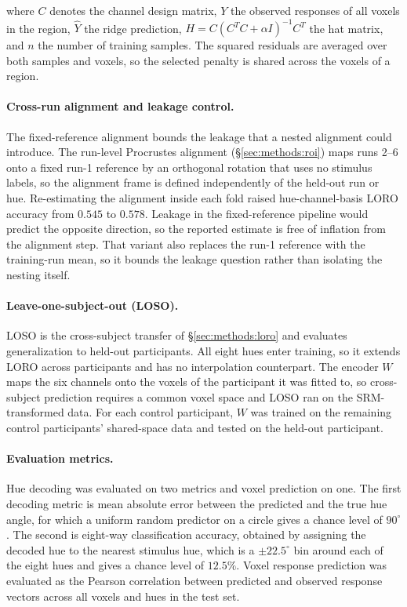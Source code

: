 where $C$ denotes the channel design matrix, $Y$ the observed responses of all voxels in the region, $\hat{Y}$ the ridge prediction, $H = C(C^T C + \alpha I)^{-1}C^T$ the hat matrix, and $n$ the number of training samples.
The squared residuals are averaged over both samples and voxels, so the selected penalty is shared across the voxels of a region.




\paragraph{Cross-run alignment and leakage control.}
The fixed-reference alignment bounds the leakage that a nested alignment could introduce. The run-level Procrustes alignment (\S\ref{sec:methods:roi}) maps runs 2--6 onto a fixed run-1 reference by an orthogonal rotation that uses no stimulus labels, so the alignment frame is defined independently of the held-out run or hue. Re-estimating the alignment inside each fold raised hue-channel-basis LORO accuracy from $0.545$ to $0.578$. Leakage in the fixed-reference pipeline would predict the opposite direction, so the reported estimate is free of inflation from the alignment step. That variant also replaces the run-1 reference with the training-run mean, so it bounds the leakage question rather than isolating the nesting itself.

\paragraph{Leave-one-subject-out (LOSO).}
LOSO is the cross-subject transfer of \S\ref{sec:methods:loro} and evaluates generalization to held-out participants. All eight hues enter training, so it extends LORO across participants and has no interpolation counterpart. The encoder $W$ maps the six channels onto the voxels of the participant it was fitted to, so cross-subject prediction requires a common voxel space and LOSO ran on the SRM-transformed data. For each control participant, $W$ was trained on the remaining control participants' shared-space data and tested on the held-out participant.

\paragraph{Evaluation metrics.}
Hue decoding was evaluated on two metrics and voxel prediction on one. The first decoding metric is mean absolute error between the predicted and the true hue angle, for which a uniform random predictor on a circle gives a chance level of $90^\circ$. The second is eight-way classification accuracy, obtained by assigning the decoded hue to the nearest stimulus hue, which is a $\pm 22.5^\circ$ bin around each of the eight hues and gives a chance level of $12.5\%$. Voxel response prediction was evaluated as the Pearson correlation between predicted and observed response vectors across all voxels and hues in the test set.

